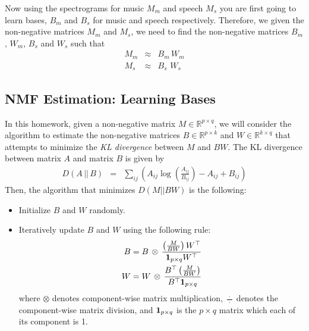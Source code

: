 Now using the spectrograms for music $M_m$ and speech $M_s$ you are first going to learn bases, $B_m$ and $B_s$ for music and speech respectively. Therefore, we given the non-negative matrices $M_m$ and $M_s$, we need to find the non-negative matrices $B_m$, $W_m$, $B_s$ and $W_s$ such that
\begin{eqnarray}
    M_m & \approx & B_m \, W_m\\
    M_s & \approx & B_s \, \, W_s
\end{eqnarray}

 
\subsection{NMF Estimation: Learning Bases}

In this homework, given a non-negative matrix $M \in \mathbb{R}^{p \times q}$, we will consider the algorithm to estimate the non-negative matrices $B \in \mathbb{R}^{p \times k}$ and $W \in \mathbb{R}^{k \times q}$ that attempts to minimize the \textit{KL divergence} between $M$ and $BW$. The KL divergence between matrix $A$ and matrix $B$ is given by
\begin{eqnarray}
        D(A \,  || \, B) & = & \sum_{ij} \left( A_{ij} \log \left( \frac{A_{ij}}{B_{ij}} \right) - A_{ij} + B_{ij} \right) 
    \end{eqnarray}
Then, the algorithm that minimizes $D(M || BW)$ is the following:
\begin{itemize}
    \item Initialize $B$ and $W$ randomly.
    \item Iteratively update $B$ and $W$ using the following rule:
    \begin{eqnarray}
        B = B \, \otimes \, \frac{\left( \frac{M}{BW} \right) W^\top}{{\bf 1}_{p \times q} W^\top} \\
        W = W \, \otimes \, \frac{B^\top \left( \frac{M}{BW} \right)}{B^\top {\bf 1}_{p \times q}}
    \end{eqnarray}
    where $\otimes$ denotes component-wise matrix multiplication, $\frac{\; \cdot \;}{\cdot}$ denotes the component-wise matrix division, and ${\bf 1}_{p \times q}$ is the $p \times q$ matrix which each of its component is 1.
\end{itemize}

